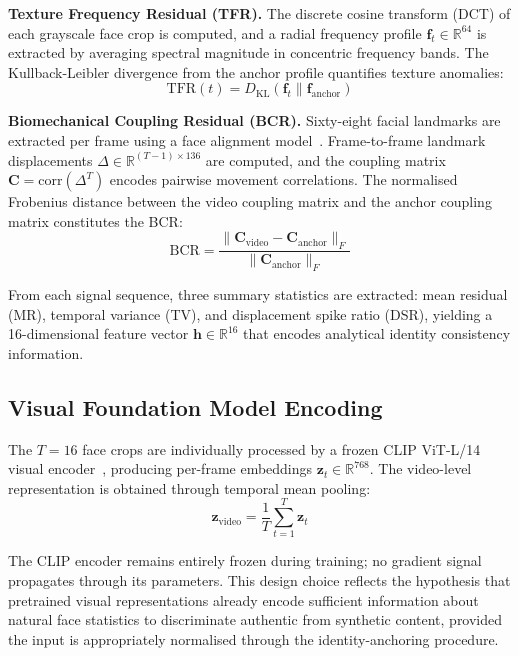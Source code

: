\documentclass[11pt, twocolumn]{article}
\begin{document}
\textbf{Texture Frequency Residual (TFR).} The discrete cosine transform (DCT) of each grayscale face crop is computed, and a radial frequency profile $\mathbf{f}_t \in \mathbb{R}^{64}$ is extracted by averaging spectral magnitude in concentric frequency bands. The Kullback-Leibler divergence from the anchor profile quantifies texture anomalies:
\begin{equation}
\text{TFR}(t) = D_{\text{KL}}(\mathbf{f}_t \| \mathbf{f}_{\text{anchor}})
\end{equation}

\textbf{Biomechanical Coupling Residual (BCR).} Sixty-eight facial landmarks are extracted per frame using a face alignment model~\cite{kazemi2014dlib}. Frame-to-frame landmark displacements $\Delta \in \mathbb{R}^{(T-1) \times 136}$ are computed, and the coupling matrix $\mathbf{C} = \text{corr}(\Delta^T)$ encodes pairwise movement correlations. The normalised Frobenius distance between the video coupling matrix and the anchor coupling matrix constitutes the BCR:
\begin{equation}
\text{BCR} = \frac{\|\mathbf{C}_{\text{video}} - \mathbf{C}_{\text{anchor}}\|_F}{\|\mathbf{C}_{\text{anchor}}\|_F}
\end{equation}

From each signal sequence, three summary statistics are extracted: mean residual (MR), temporal variance (TV), and displacement spike ratio (DSR), yielding a 16-dimensional feature vector $\mathbf{h} \in \mathbb{R}^{16}$ that encodes analytical identity consistency information.

\subsection{Visual Foundation Model Encoding}

The $T=16$ face crops are individually processed by a frozen CLIP ViT-L/14 visual encoder~\cite{radford2021clip}, producing per-frame embeddings $\mathbf{z}_t \in \mathbb{R}^{768}$. The video-level representation is obtained through temporal mean pooling:
\begin{equation}
\mathbf{z}_{\text{video}} = \frac{1}{T} \sum_{t=1}^{T} \mathbf{z}_t
\end{equation}

The CLIP encoder remains entirely frozen during training; no gradient signal propagates through its parameters. This design choice reflects the hypothesis that pretrained visual representations already encode sufficient information about natural face statistics to discriminate authentic from synthetic content, provided the input is appropriately normalised through the identity-anchoring procedure.
\end{document}
